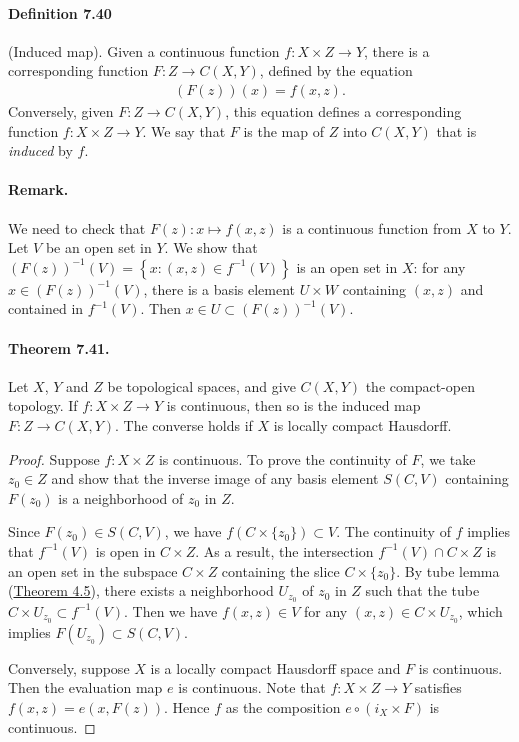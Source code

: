 \documentclass{article}
\numberwithin{equation}{section}
\theoremstyle{plain}
\theoremstyle{definition}
\begin{document}
\paragraph{Definition 7.40\label{def:7.40}} (Induced map). Given a continuous function $f:X\times Z\to Y$, there is a corresponding function $F:Z\to C(X,Y)$, defined by the equation
\begin{align*}
	(F(z))(x)= f(x,z).
\end{align*}
Conversely, given $F:Z\to C(X,Y)$, this equation defines a corresponding function $f:X\times Z\to Y$. We say that $F$ is the map of $Z$ into $C(X,Y)$ that is \textit{induced} by $f$.

\paragraph{Remark.} We need to check that $F(z):x\mapsto f(x,z)$ is a continuous function from $X$ to $Y$. Let $V$ be an open set in $Y$. We show that $(F(z))^{-1}(V) = \left\{x:(x,z)\in f^{-1}(V)\right\}$ is an open set in $X$: for any $x\in (F(z))^{-1}(V)$, there is a basis element $U\times W$ containing $(x,z)$ and contained in $f^{-1}(V)$. Then $x\in U\subset(F(z))^{-1}(V)$.

\paragraph{Theorem 7.41.\label{thm:7.41}} Let $X$, $Y$ and $Z$ be topological spaces, and give $C(X,Y)$ the compact-open topology. If $f:X\times Z\to Y$ is continuous, then so is the induced map $F:Z\to C(X,Y)$. The converse holds if $X$ is locally compact Hausdorff.
\begin{proof}
Suppose $f:X\times Z$ is continuous. To prove the continuity of $F$, we take $z_0\in Z$ and show that the inverse image of any basis element $S(C,V)$ containing $F(z_0)$ is a neighborhood of $z_0$ in $Z$.

Since $F(z_0)\in S(C,V)$, we have $f(C\times\{z_0\})\subset V$. The continuity of $f$ implies that $f^{-1}(V)$ is open in $C\times Z$. As a result, the intersection $f^{-1}(V)\cap C\times Z$ is an open set in the subspace $C\times Z$ containing the slice $C\times \{z_0\}$. By tube lemma (\hyperref[lemma:4.5]{Theorem 4.5}), there exists a neighborhood $U_{z_0}$ of $z_0$ in $Z$ such that the tube $C\times U_{z_0}\subset f^{-1}(V)$. Then we have $f(x,z)\in V$ for any $(x,z)\in C\times U_{z_0}$, which implies $F(U_{z_0})\subset S(C,V)$.

Conversely, suppose $X$ is a locally compact Hausdorff space and $F$ is continuous. Then the evaluation map $e$ is continuous. Note that $f:X\times Z\to Y$ satisfies $f(x,z)=e(x,F(z))$. Hence $f$ as the composition $e\circ(i_X\times F)$ is continuous.
\end{proof}
\end{document}
